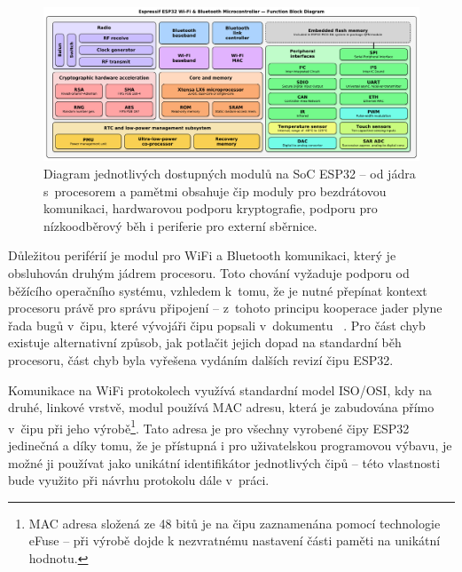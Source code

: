 \begin{figure}
    \centering
    \includegraphics[width=\textwidth]{figures/esp-function-diagram.pdf}

    \caption{Diagram jednotlivých dostupných modulů na SoC ESP32 -- od jádra s~procesorem a pamětmi obsahuje čip
    moduly pro bezdrátovou komunikaci, hardwarovou podporu kryptografie, podporu pro nízkoodběrový běh i periferie
    pro externí sběrnice\protect\footnotemark.}

    \label{fig:esp-diagram}
\end{figure}

Důležitou periférií je modul pro WiFi a Bluetooth komunikaci, který je obsluhován druhým jádrem procesoru.
Toto chování vyžaduje podporu od běžícího operačního systému, vzhledem k~tomu, že je nutné přepínat kontext procesoru
právě pro správu připojení -- z~tohoto principu kooperace jader plyne řada bugů v~čipu, které vývojáři čipu
popsali v~dokumentu ~\cite{ESP32KnownBugs}.
Pro část chyb existuje alternativní způsob, jak potlačit jejich dopad na standardní běh procesoru, část
chyb byla vyřešena vydáním dalších revizí čipu ESP32.

Komunikace na WiFi protokolech využívá standardní model ISO/OSI, kdy na druhé, linkové vrstvě, modul používá MAC
adresu, která je zabudována přímo v~čipu při jeho výrobě\footnote{MAC adresa složená ze 48 bitů je na čipu
zaznamenána pomocí technologie eFuse -- při výrobě dojde k nezvratnému nastavení části paměti na unikátní hodnotu.}.
Tato adresa je pro všechny vyrobené čipy ESP32 jedinečná a díky tomu, že je přístupná i pro uživatelskou programovou
výbavu, je možné ji používat jako unikátní identifikátor jednotlivých čipů -- této vlastnosti bude využito při návrhu
protokolu dále v~práci.

